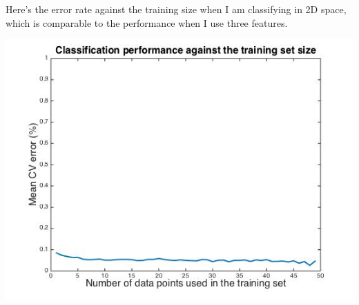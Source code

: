 \documentclass[paper=a4, fontsize=11pt]{scrartcl} %
\numberwithin{equation}{section} %
\numberwithin{figure}{section} %
\numberwithin{table}{section} %
\begin{document}
\newpage
Here's the error rate against the training size when I am classifying in 2D space, which is comparable to the performance when I use three features. 
\begin{center}
\includegraphics[scale=.5]{error_trainSize_2features.jpg}
\end{center}
\end{document}
